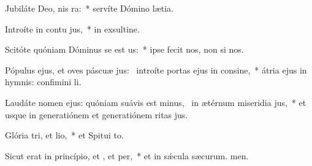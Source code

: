 \item Jubiláte Deo, nis ra:~* servíte Dómino  lætia.
\item Introíte in contu jus,~* in exsultine.
\item Scitóte quóniam Dóminus se est us:~* ipse fecit nos,  non si nos.
\item Pópulus ejus, et oves páscuæ jus:~\pscross{} introíte portas ejus in consine,~* átria ejus in hymnis: confimini li.
\item Laudáte nomen ejus: quóniam suávis est minus,~\pscross{} in ætérnum miseridia jus,~* et usque in generatiónem et generatiónem ritas jus.
\item Glória tri, et lio,~* et Spitui to.
\item Sicut erat in princípio, et , et per,~* et in sǽcula sæcurum. men.
